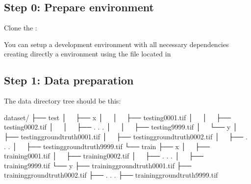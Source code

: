 \documentclass[letterpaper,10pt,english]{sphinxmanual}
\begin{document}
\subsection{Step 0: Prepare environment}
\label{\detokenize{how_to_run/bash:step-0-prepare-environment}}
Clone the :

\begin{sphinxVerbatim}[commandchars=\\\{\}]
  
\end{sphinxVerbatim}

You can set\sphinxhyphen{}up a development environment with all necessary dependencies creating
directly a  environment using the file located in 

\begin{sphinxVerbatim}[commandchars=\\\{\}]
    
\end{sphinxVerbatim}


\subsection{Step 1: Data preparation}
\label{\detokenize{how_to_run/bash:step-1-data-preparation}}\label{\detokenize{how_to_run/bash:data-preparation}}
The data directory tree should be this:

\begin{sphinxVerbatim}[commandchars=\\\{\}]
dataset/
├── test
│   ├── x
│   │   ├── testing\PYGZhy{}0001.tif
│   │   ├── testing\PYGZhy{}0002.tif
│   │   ├── . . .
│   │   ├── testing\PYGZhy{}9999.tif
│   └── y
│       ├── testing\PYGZus{}groundtruth\PYGZhy{}0001.tif
│       ├── testing\PYGZus{}groundtruth\PYGZhy{}0002.tif
│       ├── . . .
│       ├── testing\PYGZus{}groundtruth\PYGZhy{}9999.tif
└── train
    ├── x
    │   ├── training\PYGZhy{}0001.tif
    │   ├── training\PYGZhy{}0002.tif
    │   ├── . . .
    │   ├── training\PYGZhy{}9999.tif
    └── y
        ├── training\PYGZus{}groundtruth\PYGZhy{}0001.tif
        ├── training\PYGZus{}groundtruth\PYGZhy{}0002.tif
        ├── . . .
        ├── training\PYGZus{}groundtruth\PYGZhy{}9999.tif
\end{sphinxVerbatim}
\end{document}
